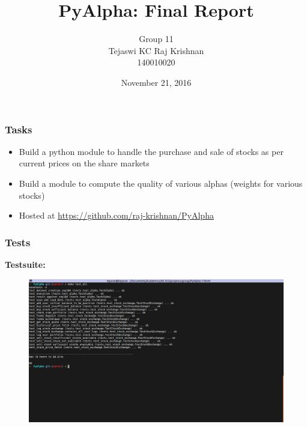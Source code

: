 \documentclass[serif,mathserif]{beamer}
\author[Tejaswi KC, Raj Krishnan]{Group 11 \\ Tejaswi KC \quad Raj Krishnan \\ 140010020 \quad 140010007}
\title[PyAlpha\hspace{2em}\insertframenumber/\inserttotalframenumber]{PyAlpha: Final Report}
\date{November 21, 2016}
\institute{Indian Institute of Technology, Bombay}
\begin{document}
    \maketitle

    \begin{frame}

        \frametitle{Tasks}

        \begin{itemize}
            \item Build a python module to handle the purchase and sale of stocks
                  as per current prices on the share markets
            \item Build a module to compute the quality of various alphas
                  (weights for various stocks)
            \item Hosted at \url{https://github.com/raj-krishnan/PyAlpha}
        \end{itemize}

    \end{frame}

    \begin{frame}

        \frametitle{Tests}

        \textbf{Testsuite:}
        \begin{figure}
            \centering
            \includegraphics[width = \linewidth]{testsuite.png}
        \end{figure}

    \end{frame}
\end{document}
